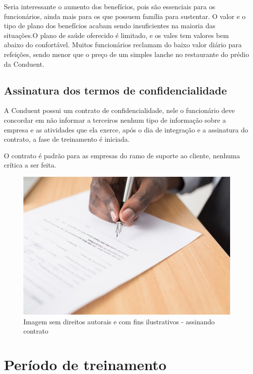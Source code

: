 \documentclass[12pt]{article}
\begin{document}
Seria interessante o aumento dos benefícios, pois são essenciais para os funcionários, ainda mais para os que possuem família para sustentar. O valor e o tipo de plano dos benefícios acabam sendo insuficientes na maioria das situações.O plano de saúde oferecido é limitado, e os vales tem valores bem abaixo do confortável. Muitos funcionários reclamam do baixo valor diário para refeições, sendo menor que o preço de um simples lanche no restaurante do prédio da Conduent.

\newpage
\subsection{Assinatura dos termos de confidencialidade}

A Conduent possui um contrato de confidencialidade, nele o funcionário deve concordar em não informar a terceiros nenhum tipo de informação sobre a empresa e as atividades que ela exerce, após o dia de integração e a assinatura do contrato, a fase de treinamento é iniciada.

O contrato é padrão para as empresas do ramo de suporte ao cliente, nenhuma crítica a ser feita.

\begin{figure}[h]
	\centering
	\includegraphics[scale=0.4]{build/images/contrato.jpg}
	\caption{Imagem sem direitos autorais e com fins ilustrativos - assinando contrato}
	\label{fig:mesh1}
\end{figure}

\newpage

\section{Período de treinamento}
\end{document}
